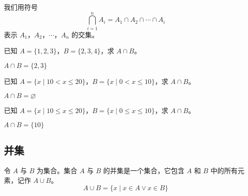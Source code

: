 我们用符号
\begin{equation*}
    \bigcap_{i=1}^n A_i=A_1 \cap A_2 \cap \cdots \cap A_i
\end{equation*}
表示 $A_1$，$A_2$，$\cdots$，$A_n$ 的交集。
\begin{collections}
    \begin{example}
        已知 $A = \{ 1, 2, 3 \}$，$B = \{ 2, 3, 4\}$，求 $A \cap B$。
    \end{example}
    \begin{solution}
        $A \cap B = \{2, 3\}$
    \end{solution}

    \spare

    \begin{example}
        已知 $A = \{ x \mid 10 < x \leq 20 \}$，$B = \{ x \mid 0 < x \leq 10 \}$，求 $A \cap B$。
    \end{example}
    \begin{solution}
        $A \cap B = \varnothing$
    \end{solution}

    \spare

    \begin{example}
        已知 $A = \{ x \mid 10 \leq x \leq 20 \}$，$B = \{ x \mid 0 \leq x \leq 10 \}$，求 $A \cap B$。
    \end{example}
    \begin{solution}
        $A \cap B = \{10\}$
    \end{solution}
\end{collections}

\subsection{并集}
\begin{definition}[集合的并集]\label{def:并集}
    令 $A$ 与 $B$ 为集合。集合 $A$ 与 $B$ 的并集是一个集合，它包含 $A$ 和 $B$ 中的所有元素，记作 $A \cup B$。
    \begin{equation*}
        A \cup B = \{x \mid x \in A \lor x \in B\}
    \end{equation*}
\end{definition}

